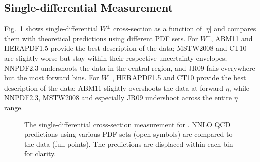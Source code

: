 \subsection{ Single-differential Measurement }

Fig.~\ref{fig:Comb:NNLO:W} shows single-differential $W^{\pm}$ cross-section as a function of $|\eta|$ and compares them with theoretical predictions using different PDF sets. For $W^-$, ABM11 and HERAPDF1.5 provide the best description of the data; MSTW2008 and CT10 are slightly worse but stay within their respective uncertainty envelopes; NNPDF2.3 undershoots the data in the central region, and JR09 fails everywhere but the most forward bins. For $W^+$, HERAPDF1.5 and CT10 provide the best description of the data; ABM11 slightly overshoots the data at forward $\eta$, while NNPDF2.3, MSTW2008 and especially JR09 undershoot across the entire $\eta$ range.

\begin{figure}[phtb]
  \begin{center}
 \caption{ The single-differential cross-section measurement for \Wpmmn. NNLO QCD predictions using various PDF sets (open symbols) are compared to the data (full points). The predictions are displaced within each bin for clarity. }
\label{fig:Comb:NNLO:W}
 \end{center}
\end{figure}

